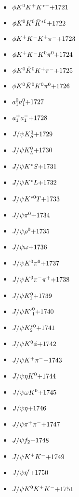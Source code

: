 \begin{multicols}{3}
\begin{itemize}
 \item $ \phi K^{0} K^{+} K^{*-} \hfill{+1721}$
 \item $ \phi K^{0} K^{0} \bar{K}^{*0} \hfill{+1722}$
 \item $ \phi K^{+} K^{-} K^{+} \pi^{-} \hfill{+1723}$
 \item $ \phi K^{+} K^{-} K^{0} \pi^{0} \hfill{+1724}$
 \item $ \phi K^{0} \bar{K}^{0} K^{+} \pi^{-} \hfill{+1725}$
 \item $ \phi K^{0} \bar{K}^{0} K^{0} \pi^{0} \hfill{+1726}$
 \item $ a_{1}^{0} a_{1}^{0} \hfill{+1727}$
 \item $ a_{1}^{+} a_{1}^{-} \hfill{+1728}$
 \item $ J/\psi K_{S}^{0} \hfill{+1729}$
 \item $ J/\psi K_{L}^{0} \hfill{+1730}$
 \item $ J/\psi K^{*}S \hfill{+1731}$
 \item $ J/\psi K^{*}L \hfill{+1732}$
 \item $ J/\psi K^{*0}T \hfill{+1733}$
 \item $ J/\psi \pi^{0} \hfill{+1734}$
 \item $ J/\psi \rho^{0} \hfill{+1735}$
 \item $ J/\psi \omega \hfill{+1736}$
 \item $ J/\psi K^{0} \pi^{0} \hfill{+1737}$
 \item $ J/\psi K^{0} \pi^{-} \pi^{+} \hfill{+1738}$
 \item $ J/\psi K_{1}^{0} \hfill{+1739}$
 \item $ J/\psi {K^{\prime}}_{1}^{0} \hfill{+1740}$
 \item $ J/\psi K_{2}^{*0} \hfill{+1741}$
 \item $ J/\psi K^{0} \phi \hfill{+1742}$
 \item $ J/\psi K^{+} \pi^{-} \hfill{+1743}$
 \item $ J/\psi \eta K^{0} \hfill{+1744}$
 \item $ J/\psi \omega K^{0} \hfill{+1745}$
 \item $ J/\psi \eta \hfill{+1746}$
 \item $ J/\psi \pi^{+} \pi^{-} \hfill{+1747}$
 \item $ J/\psi f_{2} \hfill{+1748}$
 \item $ J/\psi K^{+} K^{-} \hfill{+1749}$
 \item $ J/\psi {\eta^{\prime}} \hfill{+1750}$
 \item $ J/\psi K^{0} K^{+} K^{-} \hfill{+1751}$

\end{itemize}
\end{multicols}
